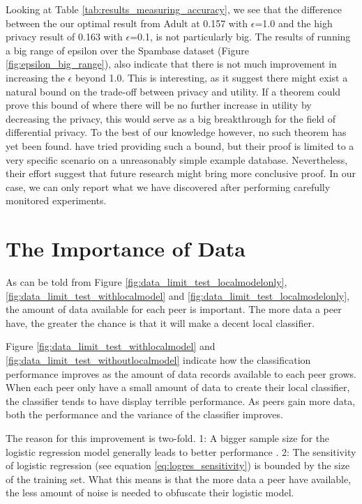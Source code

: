 Looking at Table \ref{tab:results_measuring_accuracy}, we see that the difference between the our optimal result from Adult at 0.157 with $\epsilon$=1.0 and the high privacy result of 0.163 with $\epsilon$=0.1, is not particularly big. The results of running a big range of epsilon over the Spambase dataset (Figure \ref{fig:epsilon_big_range}), also indicate that there is not much improvement in increasing the $\epsilon$ beyond 1.0. This is interesting, as it suggest there might exist a natural bound on the trade-off between privacy and utility. If a theorem could prove this bound of where there will be no further increase in utility by decreasing the privacy, this would serve as a big breakthrough for the field of differential privacy. To the best of our knowledge however, no such theorem has yet been found. \cite{lee2011epsilonBound} have tried providing such a bound, but their proof is limited to a very specific scenario on a unreasonably simple example database. Nevertheless, their effort suggest that future research might bring more conclusive proof. In our case, we can only report what we have discovered after performing carefully monitored experiments.   


\section{The Importance of Data} \label{importance_of_data}
As can be told from Figure \ref{fig:data_limit_test_localmodelonly}, \ref{fig:data_limit_test_withlocalmodel} and \ref{fig:data_limit_test_localmodelonly}, the amount of data available for each peer is important. The more data a peer have, the greater the chance is that it will make a decent local classifier. 


Figure \ref{fig:data_limit_test_withlocalmodel} and \ref{fig:data_limit_test_withoutlocalmodel} indicate how the classification performance improves as the amount of data records available to each peer grows. When each peer only have a small amount of data to create their local classifier, the classifier tends to have display terrible performance. As peers gain more data, both the performance and the variance of the classifier improves.     

The reason for this improvement is two-fold. 1: A bigger sample size for the logistic regression model generally leads to better performance \cite{peduzzi1996simulation}. 2: The sensitivity of logistic regression (see equation \ref{eq:logres_sensitivity}) is bounded by the size of the training set. What this means is that the more data a peer have available, the less amount of noise is needed to obfuscate their logistic model. 

